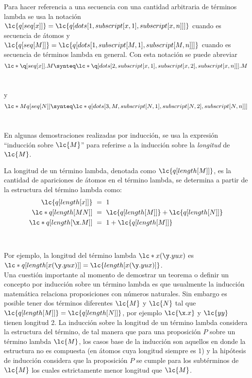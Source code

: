 Para hacer referencia a una secuencia con una cantidad arbitraria de términos lambda se usa la notación \(\lc{q[seq[x]]}=\lc{q[dots[1,subscript[x,1],subscript[x,n]]]}\) cuando es secuencia de átomos y \(\lc{q[seq[M]]}=\lc{q[dots[1,subscript[M,1],subscript[M,n]]]}\) cuando es secuencia de términos lambda en general. Con esta notación se puede abreviar \\

\[\lc*{\q[seq[x]].M} \synteq \lc*{\q[dots[2,subscript[x,1],subscript[x,2],subscript[x,n]]].M}\] \

y \\

\[\lc*{M q[seq[N]]} \synteq \lc*{q[dots[3,M,subscript[N,1],subscript[N,2],subscript[N,n]]]}\] \

En algunas demostraciones realizadas por inducción, se usa la expresión ``inducción sobre \(\lc{M}\)'' para referirse a la inducción sobre la \emph{longitud} de \(\lc{M}\). \\

\begin{defi}[Longitud] La longitud de un término lambda, denotada como \(\lc{q[length[M]]}\), es la cantidad de apariciones de átomos en el término lambda, se determina a partir de la estructura del término lambda como: \
  \label{definicion:longitud}
  \begin{align*}
    \lc{q[length[x]]}\ &=\ 1 \\
    \lc*{q[length[M N]]}\ &=\ \lc{q[length[M]]} + \lc{q[length[N]]} \\
    \lc*{q[length[\x.M]]}\ &=\ 1 + \lc{q[length[M]]}
  \end{align*}
\end{defi} \

Por ejemplo, la longitud del término lambda \(\lc*{x(\y.y u x)}\) es \(\lc*{q[length[x(\y.y u x)]]}=\lc{length[x(\y.y u x)]}\). \\

Una cuestión importante al momento de demostrar un teorema o definir un concepto por inducción sobre un término lambda es que usualmente la inducción matemática relaciona proposiciones con números naturales. Sin embargo es posible tener dos términos diferentes \(\lc{M}\) y \(\lc{N}\) tal que \(\lc{q[length[M]]}=\lc{q[length[N]]}\), por ejemplo \(\lc{\x.x}\) y \(\lc{y y}\) tienen longitud 2. La inducción sobre la longitud de un término lambda considera la estructura del término, de tal manera que para una proposición \(P\) sobre un término lambda \(\lc{M}\), los casos base de la inducción son aquellos en donde la estructura no es compuesta (en átomos cuya longitud siempre es 1) y la hipótesis de inducción considera que la proposición \(P\) se cumple para los subtérminos de \(\lc{M}\) los cuales estrictamente menor longitud que \(\lc{M}\). \\

